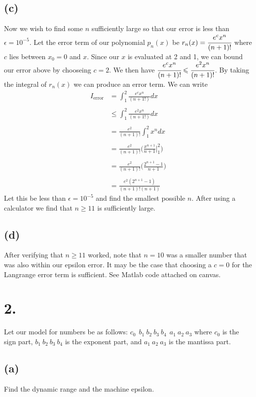 \documentclass{article}
\begin{document}
	\subsection*{(c)}
		Now we wish to find some $n$ sufficiently large so that our error is less than $\epsilon = 10^{-5}$.
		Let the error term of our polynomial $p_n(x)$ be $r_n(x) = \cfrac{e^cx^n}{(n+1)!}$ where $c$ lies between $x_0 = 0$ and $x$.
		Since our $x$ is evaluated at 2 and 1, we can bound our error above by chooseing $c = 2$.
		We then have $\cfrac{e^cx^n}{(n+1)!} \leqslant \cfrac{e^2x^n}{(n+1)!}$.
		By taking the integral of $r_n(x)$ we can produce an error term.
		We can write
		\begin{align*}
			I_{\text{error}} & = \int_1^2\frac{e^cx^n}{(n+1!)}dx \\\\
			& \leqslant \int_1^2\frac{e^2x^n}{(n+1!)}dx \\\\
			& = \frac{e^2}{(n+1)!} \int_1^2x^ndx\\\\
			& = \frac{e^2}{(n+1)!} \bigg(\frac{x^{n+1}}{n+1}\bigg|_1^2\bigg)\\\\
			& = \frac{e^2}{(n+1)!} \bigg(\frac{2^{n+1}-1}{n+1}\bigg)\\\\
			& = \frac{e^2(2^{n+1}-1)}{(n+1)!(n+1)}
		\end{align*}
		Let this be less than $\epsilon = 10^{-5}$ and find the smallest possible $n$.
		After using a calculator we find that $n \geqslant 11$ is sufficiently large.
	\subsection*{(d)}
		After verifying that $n \geqslant 11$ worked, note that $n = 10$ was a smaller number that was also within our epsilon error.
		It may be the case that choosing a $c = 0$ for the Langrange error term is sufficient. See Matlab code attached on canvas.
\section*{2.}
	Let our model for numbers be as follows: $c_0 \ \ b_1 \ b_2 \ b_3 \ b_4
	\ \ a_1 \ a_2 \ a_3$ where $c_0$ is the sign part, $b_1 \ b_2 \ b_3 \ b_4$ is the exponent part,
	and $a_1 \ a_2 \ a_3$ is the mantissa part.
	\subsection*{(a)}
		Find the dynamic range and the machine epsilon. \\
\end{document}
